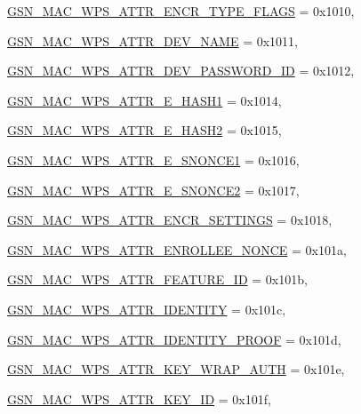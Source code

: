 \begin{DoxyCompactItemize}
\hyperlink{a00642_gga0ae19d69a0b381d883890df8a7812414a1bccefdc1fb8e59b0f1b2143760a6644}{GSN\_\-MAC\_\-WPS\_\-ATTR\_\-ENCR\_\-TYPE\_\-FLAGS} =  0x1010, 
\par
\hyperlink{a00642_gga0ae19d69a0b381d883890df8a7812414ac600b93117d1fd53e66ed52e54699451}{GSN\_\-MAC\_\-WPS\_\-ATTR\_\-DEV\_\-NAME} =  0x1011, 
\par
\hyperlink{a00642_gga0ae19d69a0b381d883890df8a7812414a08ccfbe8970a56aae777bf20f46d3b65}{GSN\_\-MAC\_\-WPS\_\-ATTR\_\-DEV\_\-PASSWORD\_\-ID} =  0x1012, 
\par
\hyperlink{a00642_gga0ae19d69a0b381d883890df8a7812414affb3ee90dc1870d4a399814ef2e72f7b}{GSN\_\-MAC\_\-WPS\_\-ATTR\_\-E\_\-HASH1} =  0x1014, 
\par
\hyperlink{a00642_gga0ae19d69a0b381d883890df8a7812414a077695e5257e9e646d38ab4d649df7d7}{GSN\_\-MAC\_\-WPS\_\-ATTR\_\-E\_\-HASH2} =  0x1015, 
\par
\hyperlink{a00642_gga0ae19d69a0b381d883890df8a7812414a148038d92c6054711427dd01c4178df3}{GSN\_\-MAC\_\-WPS\_\-ATTR\_\-E\_\-SNONCE1} =  0x1016, 
\par
\hyperlink{a00642_gga0ae19d69a0b381d883890df8a7812414ad67e234cf3cd78d829db04fd1d76d592}{GSN\_\-MAC\_\-WPS\_\-ATTR\_\-E\_\-SNONCE2} =  0x1017, 
\par
\hyperlink{a00642_gga0ae19d69a0b381d883890df8a7812414a061dcf9ed592316d74edafcbdd408abc}{GSN\_\-MAC\_\-WPS\_\-ATTR\_\-ENCR\_\-SETTINGS} =  0x1018, 
\par
\hyperlink{a00642_gga0ae19d69a0b381d883890df8a7812414a6e68d887428b6b8305aa9c18cb3d1c5a}{GSN\_\-MAC\_\-WPS\_\-ATTR\_\-ENROLLEE\_\-NONCE} =  0x101a, 
\par
\hyperlink{a00642_gga0ae19d69a0b381d883890df8a7812414a522f5dba15cb3d3aacdcd036e2b59150}{GSN\_\-MAC\_\-WPS\_\-ATTR\_\-FEATURE\_\-ID} =  0x101b, 
\par
\hyperlink{a00642_gga0ae19d69a0b381d883890df8a7812414ab35724dadfe61d6ee4b8db2c26f5d592}{GSN\_\-MAC\_\-WPS\_\-ATTR\_\-IDENTITY} =  0x101c, 
\par
\hyperlink{a00642_gga0ae19d69a0b381d883890df8a7812414addddcc8e24644c522a4b64a303dad605}{GSN\_\-MAC\_\-WPS\_\-ATTR\_\-IDENTITY\_\-PROOF} =  0x101d, 
\par
\hyperlink{a00642_gga0ae19d69a0b381d883890df8a7812414ac6599d36351e718ee91228713e9ea30b}{GSN\_\-MAC\_\-WPS\_\-ATTR\_\-KEY\_\-WRAP\_\-AUTH} =  0x101e, 
\par
\hyperlink{a00642_gga0ae19d69a0b381d883890df8a7812414a3830bf83e6e906525b7c4b9fba9a4cf7}{GSN\_\-MAC\_\-WPS\_\-ATTR\_\-KEY\_\-ID} =  0x101f, 

\end{DoxyCompactItemize}
